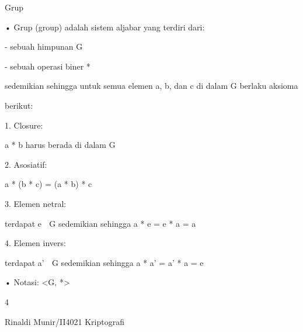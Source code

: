 \documentclass{article}
\begin{document}

Grup 

• Grup (group) adalah sistem aljabar yang terdiri dari:

 - sebuah himpunan G

 - sebuah operasi biner *

 sedemikian sehingga untuk semua elemen a, b, dan c di dalam G berlaku aksioma 

berikut:

 1.  Closure:  

a * b harus berada di dalam G

 2.  Asosiatif:  

a * (b * c) = (a * b) * c

 3.  Elemen netral: 

terdapat e  G sedemikian sehingga  a * e = e * a = a 

 4.  Elemen invers: 

terdapat a’  G sedemikian sehingga  a * a’ = a’ * a = e 

• Notasi: <G, *>

4

Rinaldi Munir/II4021 Kriptografi
\end{document}
